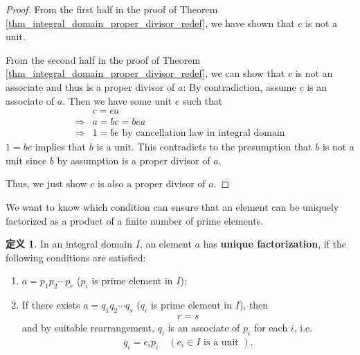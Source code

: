 \documentclass[utf8]{ctexbook}
\theoremstyle{definition}
\newtheorem{protodefinition}{定义}[section]
\newenvironment{definition}
   {\colorlet{shadecolor}{black!15}\begin{shaded}\begin{protodefinition}}
   {\end{protodefinition}\end{shaded}}
\begin{document}
\begin{proof}
From the first half in the proof of Theorem \ref{thm_integral_domain_proper_divisor_redef}, we have shown that $c$ is not a unit.

From the second half in the proof of Theorem \ref{thm_integral_domain_proper_divisor_redef}, we can show that $c$ is not an associate and thus is a proper divisor of $a$: By contradiction, assume $c$ is an associate of $a$. Then we have some unit $e$ such that
\begin{align*}
& c = e a \\
\Longrightarrow & a = b c = b e a \\
\Longrightarrow & 1 = b e \mbox{ by cancellation law in integral domain}
\end{align*}
$ 1 = be $ implies that $b$ is a unit. This contradicts to the presumption that $b$ is not a unit since $b$ by assumption is a proper divisor of $a$.

Thus, we just show $c$ is also a proper divisor of $a$.
\end{proof}

We want to know which condition can ensure that an element can be uniquely factorized as a product of a finite number of prime elements.

\begin{definition}\label{def_integral_domain_unique_factorization}
In an integral domain $I$, an element $a$ has \textbf{unique factorization}, if the following conditions are satisfied:
\begin{enumerate}
\item{$a = p_1 p_2 \cdots p_r$ ($p_i$ is prime element in $I$);}
\item{If there exists $a = q_1 q_2 \cdots q_s$ ($q_i$ is prime element in $I$), then
\begin{align*}
r = s
\end{align*}
and by suitable rearrangement, $q_i$ is an associate of $p_i$ for each $i$, i.e.
\begin{align*}
q_i = e_i p_i \quad ( e_i \in I \mbox{ is a unit } ).
\end{align*}  
}
\end{enumerate}
\end{definition}
\end{document}
